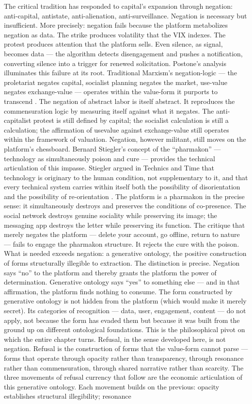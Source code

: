 The critical tradition has responded to capital’s expansion through negation: anti-capital, antistate, anti-alienation, anti-surveillance. Negation is necessary but insufficient. More precisely: negation fails because the platform metabolizes negation as data. The strike produces volatility that the VIX indexes. The protest produces attention that the platform sells. Even silence, as signal, becomes data — the algorithm detects disengagement and pushes a notification, converting silence into a trigger for renewed solicitation. Postone’s analysis illuminates this failure at its root. Traditional Marxism’s negation-logic — the proletariat negates capital, socialist planning negates the market, use-value negates exchange-value — operates within the value-form it purports to transcend \cite[pp.~185--225]{postone_1993}. The negation of abstract labor is itself abstract. It reproduces the commensuration logic by measuring itself against what it negates. The anti-capitalist protest is still defined by capital; the socialist calculation is still a calculation; the affirmation of usevalue against exchange-value still operates within the framework of valuation. Negation, however militant, still moves on the platform’s chessboard. Bernard Stiegler’s concept of the “pharmakon” — technology as simultaneously poison and cure — provides the technical articulation of this impasse. Stiegler argued in Technics and Time that technology is originary to the human condition, not supplementary to it, and that every technical system carries within itself both the possibility of disorientation and the possibility of re-orientation \cite{stiegler_1998}. The platform is a pharmakon in the precise sense: it simultaneously destroys and preserves the conditions of co-presence. The social network destroys genuine sociality while preserving its image; the messaging app destroys the letter while preserving its function. The critique that merely negates the platform — delete your account, go offline, return to nature — fails to engage the pharmakon structure. It rejects the cure with the poison. What is needed exceeds negation: a generative ontology, the positive construction of forms structurally illegible to extraction. The distinction is precise. Negation says “no” to the platform and thereby grants the platform the power of determination. Generative ontology says “yes” to something else — and in that affirmation, the platform finds nothing to consume. The form constructed by generative ontology is not hidden from the platform (which would make it merely secret). Its categories of recognition — data, user, engagement, content — do not apply, not because the form has evaded them but because it was built from the ground up on different ontological foundations. This is the philosophical pivot on which the entire chapter turns. Refusal, in the sense developed here, is not negation. Refusal is the construction of forms that the value-form cannot parse — forms that operate through opacity rather than transparency, through resonance rather than commensuration, through shared narrative rather than scarcity. The three movements of refusal currency that follow are the economic articulation of this generative ontology. Each movement builds on the previous: opacity establishes structural illegibility; resonance 